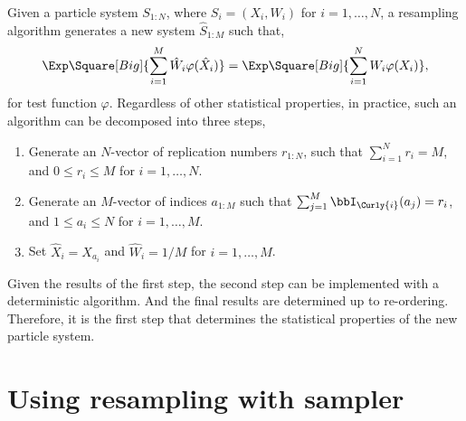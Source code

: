 Given a particle system $S_{1:N}$, where $S_i = (X_i,W_i)$ for $i = 1,\dots,N$,
a resampling algorithm generates a new system $\hat{S}_{1:M}$ such that,
\begin{equation*}
  \Exp\Square[Big]{\sum_{i=1}^M{\hat{W}_i\varphi(\hat{X}_i)}} =
  \Exp\Square[Big]{\sum_{i=1}^N{W_i\varphi(X_i)}},
\end{equation*}
for test function $\varphi$. Regardless of other statistical properties, in
practice, such an algorithm can be decomposed into three steps,
\begin{enumerate}
  \item Generate an $N$-vector of replication numbers $r_{1:N}$, such that
    $\sum_{i=1}^N r_i = M$, and $0 \le r_i \le M$ for $i=1,\dots,N$.
  \item Generate an $M$-vector of indices $a_{1:M}$ such that $\sum_{j=1}^M
    \bbI_{\Curly{i}}(a_j) = r_i$, and $1 \le a_i \le N$ for $i = 1,\dots,M$.
  \item Set $\hat{X}_i = X_{a_i}$ and $\hat{W}_i = 1 / M$ for $i = 1,\dots,M$.
\end{enumerate}
Given the results of the first step, the second step can be implemented with a
deterministic algorithm. And the final results are determined up to
re-ordering. Therefore, it is the first step that determines the statistical
properties of the new particle system.

\section{Using resampling with sampler}
\label{sec:Using resampling with sampler}

